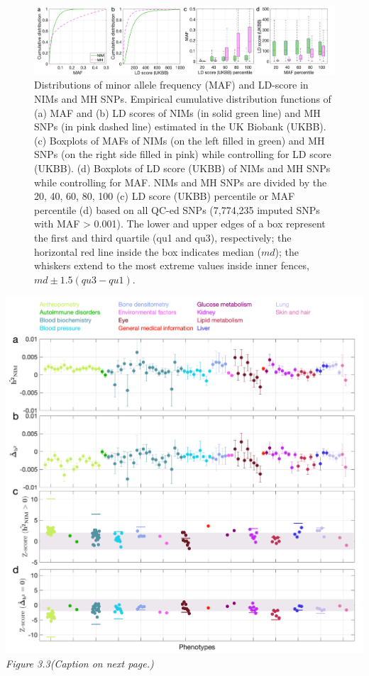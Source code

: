 \begin{figure}[!htb]
    \centering
    \includegraphics[width=\textwidth]{chapter3/figures/fig3.2.png}
    \caption{Distributions of minor allele frequency (MAF) and LD-score in NIMs and MH SNPs. Empirical cumulative distribution functions of (a) MAF and (b) LD scores of NIMs (in solid green line) and MH SNPs (in pink dashed line) estimated in the UK Biobank (UKBB). (c) Boxplots of MAFs of NIMs (on the left filled in green) and MH SNPs (on the right side filled in pink) while controlling for LD score (UKBB). (d) Boxplots of LD score (UKBB) of NIMs and MH SNPs while controlling for MAF. NIMs and MH SNPs are divided by the 20, 40, 60, 80, 100 (c) LD score (UKBB) percentile or MAF percentile (d) based on all QC-ed SNPs (7,774,235 imputed SNPs with MAF > 0.001). The lower and upper edges of a box represent the first and third quartile (qu1 and qu3), respectively; the horizontal red line inside the box indicates median ($md$); the whiskers extend to the most extreme values inside inner fences, $md \pm 1.5 (qu3 - qu1)$.}
    \label{fig:3.2}
\end{figure}
\FloatBarrier
\clearpage

\begin{center}
\includegraphics[width=\textwidth]{chapter3/figures/fig3.3.png}
\emph{Figure 3.3(Caption on next page.)}
\label{fig:3.3}
\end{center}

